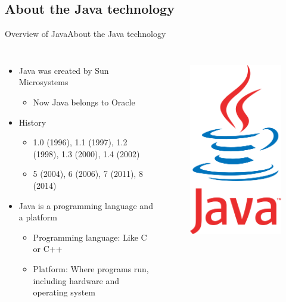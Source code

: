 \documentclass{beamer}
\begin{document}
\subsection[About the Java technology]{About the Java technology}
\begin{frame}{Overview of Java}{About the Java technology}
    \begin{columns}
  		  \begin{itemize}
			\item Java was created by Sun Microsystems
		   	\begin{itemize}
				\item Now Java belongs to Oracle
		  	\end{itemize}

			\item History
		   	\begin{itemize}
				\item 1.0 (1996), 1.1 (1997), 1.2 (1998), 1.3 (2000), 1.4 (2002)
				\item 5 (2004), 6 (2006), 7 (2011), 8 (2014)
		  	\end{itemize}
		\item Java is a programming language and a platform
	    	\begin{itemize}
			\item Programming language: Like C or C++
			\item Platform: Where programs run, including hardware and operating system
	    	\end{itemize}
		  	\end{itemize}
   	 	\begin{figure}[t]
		\begin{center}
		    \includegraphics[width=0.6\linewidth]{figs/java}\\

\end{center}
\end{figure}
\end{columns}
\end{frame}
\end{document}
